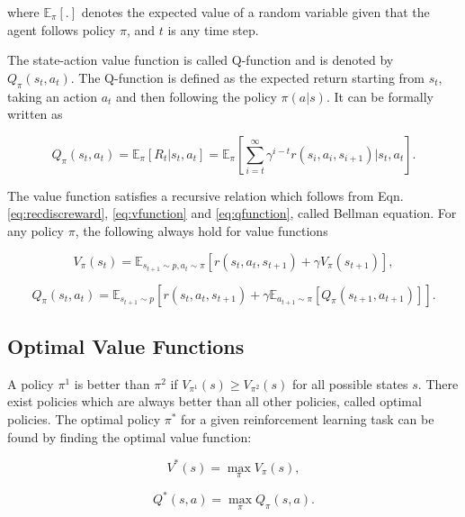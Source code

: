 where $\mathbb{E}_\pi[.]$ denotes the expected value of a random variable given that the agent follows policy $\pi$, and $t$ is any time step.

The state-action value function is called Q-function and is denoted by $Q_\pi(s_t,a_t)$. The Q-function is defined as the expected return starting from $s_t$, taking an action $a_t$ and then following the policy $\pi(a|s)$. It can be formally written as

\begin{equation}
\label{eq:qfunction}
Q_\pi(s_t,a_t) = \mathbb{E}_\pi[R_t|s_t,a_t] = \mathbb{E}_\pi\left[\sum_{i=t}^\infty \gamma^{i-t}r(s_i, a_i, s_{i+1})|s_t, a_t\right].
\end{equation}

The value function satisfies a recursive relation which follows from Eqn. \ref{eq:recdiscreward}, \ref{eq:vfunction} and \ref{eq:qfunction}, called Bellman equation. For any policy $\pi$, the following always hold for value functions

\begin{equation}\label{eq:bellman_v}
V_\pi(s_t) = \mathbb{E}_{s_{t+1}\sim p, a_t \sim \pi}[r(s_t,a_t,s_{t+1}) + \gamma V_\pi(s_{t+1})],
\end{equation}

\begin{equation}\label{eq:bellman_q}
Q_\pi(s_t,a_t) = \mathbb{E}_{s_{t+1}\sim p}[r(s_t,a_t,s_{t+1}) + \gamma\mathbb{E}_{a_{t+1}\sim\pi}[Q_\pi(s_{t+1},a_{t+1})]].
\end{equation}

\subsection{Optimal Value Functions}
A policy $\pi^1$ is better than $\pi^2$ if $V_{\pi^1}(s) \geq V_{\pi^2}(s) $ for all possible states $s$. There exist policies which are always better than all other policies, called optimal policies. The optimal policy $\pi^*$ for a given reinforcement learning task can be found by finding the optimal value function:

\begin{equation}\label{eq:bellmanv_opt}
V^*(s) = \max_\pi V_\pi(s),
\end{equation}

\begin{equation}\label{eq:bellmanq_opt}
Q^*(s,a) = \max_\pi Q_\pi(s,a).
\end{equation}

